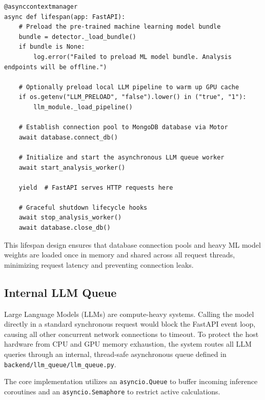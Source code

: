 \documentclass[12pt,a4paper]{report}
\begin{document}
\begin{lstlisting}[style=pythonstyle, caption={FastAPI Application initialization and lifespan context manager}]
@asynccontextmanager
async def lifespan(app: FastAPI):
    # Preload the pre-trained machine learning model bundle
    bundle = detector._load_bundle()
    if bundle is None:
        log.error("Failed to preload ML model bundle. Analysis endpoints will be offline.")
    
    # Optionally preload local LLM pipeline to warm up GPU cache
    if os.getenv("LLM_PRELOAD", "false").lower() in ("true", "1"):
        llm_module._load_pipeline()

    # Establish connection pool to MongoDB database via Motor
    await database.connect_db()
    
    # Initialize and start the asynchronous LLM queue worker
    await start_analysis_worker()

    yield  # FastAPI serves HTTP requests here

    # Graceful shutdown lifecycle hooks
    await stop_analysis_worker()
    await database.close_db()
\end{lstlisting}

This lifespan design ensures that database connection pools and heavy ML model weights are loaded once in memory and shared across all request threads, minimizing request latency and preventing connection leaks.

\subsection{Internal LLM Queue}

Large Language Models (LLMs) are compute-heavy systems. Calling the model directly in a standard synchronous request would block the FastAPI event loop, causing all other concurrent network connections to timeout. To protect the host hardware from CPU and GPU memory exhaustion, the system routes all LLM queries through an internal, thread-safe asynchronous queue defined in \texttt{backend/llm\_queue/llm\_queue.py}.

The core implementation utilizes an \texttt{asyncio.Queue} to buffer incoming inference coroutines and an \texttt{asyncio.Semaphore} to restrict active calculations.
\end{document}

